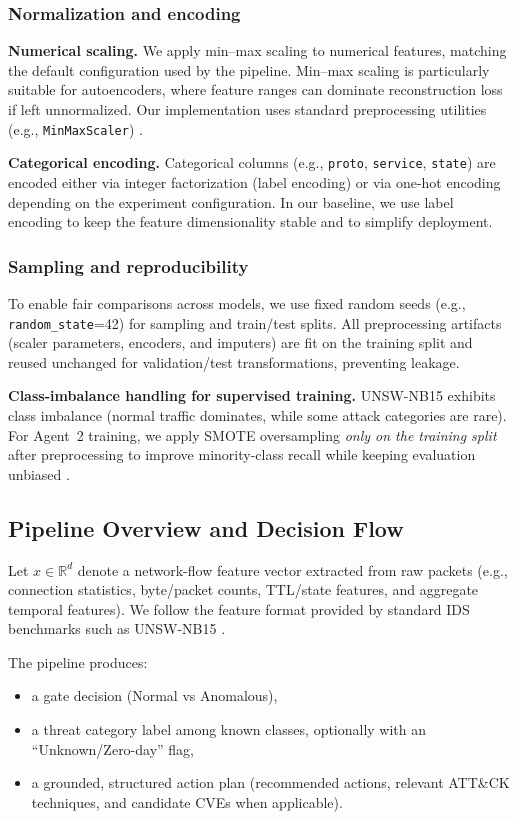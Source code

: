 \subsubsection{Normalization and encoding}
\textbf{Numerical scaling.} We apply min--max scaling to numerical features, matching the default configuration used by the pipeline. Min--max scaling is particularly suitable for autoencoders, where feature ranges can dominate reconstruction loss if left unnormalized. Our implementation uses standard preprocessing utilities (e.g., \texttt{MinMaxScaler}) \cite{Pedregosa2011Scikit}.

\textbf{Categorical encoding.} Categorical columns (e.g., \texttt{proto}, \texttt{service}, \texttt{state}) are encoded either via integer factorization (label encoding) or via one-hot encoding depending on the experiment configuration. In our baseline, we use label encoding to keep the feature dimensionality stable and to simplify deployment.

\subsubsection{Sampling and reproducibility}
To enable fair comparisons across models, we use fixed random seeds (e.g., \texttt{random\_state}=42) for sampling and train/test splits. All preprocessing artifacts (scaler parameters, encoders, and imputers) are fit on the training split and reused unchanged for validation/test transformations, preventing leakage.

\textbf{Class-imbalance handling for supervised training.} UNSW-NB15 exhibits class imbalance (normal traffic dominates, while some attack categories are rare). For Agent~2 training, we apply SMOTE oversampling \emph{only on the training split} after preprocessing to improve minority-class recall while keeping evaluation unbiased \cite{Chawla2002SMOTE}.

\subsection{Pipeline Overview and Decision Flow}
\label{sec:method_overview}

Let $x \in \mathbb{R}^d$ denote a network-flow feature vector extracted from raw packets (e.g., connection statistics, byte/packet counts, TTL/state features, and aggregate temporal features). We follow the feature format provided by standard IDS benchmarks such as UNSW-NB15 \cite{Moustafa2015UNSW}.

The pipeline produces:
\begin{itemize}
  \item a gate decision (Normal vs Anomalous),
  \item a threat category label among known classes, optionally with an ``Unknown/Zero-day'' flag,
  \item a grounded, structured action plan (recommended actions, relevant ATT\&CK techniques, and candidate CVEs when applicable).
\end{itemize}

